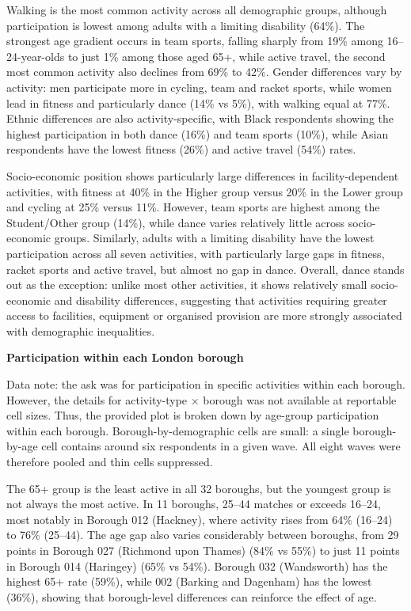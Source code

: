\documentclass[ %
                    author={Ashrey Ashrey, Sanya Kapoor, Trisha Sharma, Yash Bhooshan Pandloskar},
                supervisor={Dr. Dalila O’Grady},
                    degree={MSc},
                     title={Using machine learning to forecast physical activity participation, volunteering and activity patterns in London},
                  subtitle={},
                      type={},
                      year={2021}]{dissertation}
\begin{document}
Walking is the most common activity across all demographic groups, although participation is lowest among adults with a limiting disability (64\%). The strongest age gradient occurs in team sports, falling sharply from 19\% among 16--24-year-olds to just 1\% among those aged 65+, while active travel, the second most common activity also declines from 69\% to 42\%. Gender differences vary by activity: men participate more in cycling, team and racket sports, while women lead in fitness and particularly dance (14\% vs 5\%), with walking equal at 77\%. Ethnic differences are also activity-specific, with Black respondents showing the highest participation in both dance (16\%) and team sports (10\%), while Asian respondents have the lowest fitness (26\%) and active travel (54\%) rates.

Socio-economic position shows particularly large differences in facility-dependent activities, with fitness at 40\% in the Higher group versus 20\% in the Lower group and cycling at 25\% versus 11\%. However, team sports are highest among the Student/Other group (14\%), while dance varies relatively little across socio-economic groups. Similarly, adults with a limiting disability have the lowest participation across all seven activities, with particularly large gaps in fitness, racket sports and active travel, but almost no gap in dance. Overall, dance stands out as the exception: unlike most other activities, it shows relatively small socio-economic and disability differences, suggesting that activities requiring greater access to facilities, equipment or organised provision are more strongly associated with demographic inequalities.

\noindent
\textbf{Participation within each London borough}

Data note: the ask was for participation in specific activities within each borough. However, the details for activity-type $\times$ borough was not available at reportable cell sizes. Thus, the provided plot is broken down by age-group participation within each borough. Borough-by-demographic cells are small: a single borough-by-age cell contains around six respondents in a given wave. All eight waves were therefore pooled and thin cells suppressed.

The 65+ group is the least active in all 32 boroughs, but the youngest group is not always the most active. In 11 boroughs, 25--44 matches or exceeds 16--24, most notably in Borough 012 (Hackney), where activity rises from 64\% (16--24) to 76\% (25--44). The age gap also varies considerably between boroughs, from 29 points in Borough 027 (Richmond upon Thames) (84\% vs 55\%) to just 11 points in Borough 014 (Haringey) (65\% vs 54\%). Borough 032 (Wandsworth) has the highest 65+ rate (59\%), while 002 (Barking and Dagenham) has the lowest (36\%), showing that borough-level differences can reinforce the effect of age.
\end{document}

